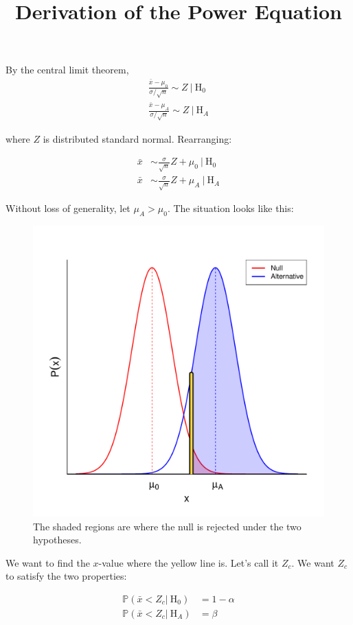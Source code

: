 \documentclass{article}
\title{Derivation of the Power Equation}
\date{}
\begin{document}
\maketitle

By the central limit theorem,
\begin{align*}
\frac{\bar{x} - \mu_0}{\sigma/\sqrt{n}}  \sim Z\ \big|\ \text{H}_0 \\
\frac{\bar{x} - \mu_A}{\sigma/\sqrt{n}}  \sim Z\ \big|\ \text{H}_A
\end{align*}

where $Z$ is distributed standard normal. Rearranging:

\begin{align*}
\bar{x} &\sim \frac{\sigma}{\sqrt{n}}Z + \mu_0\ \big|\ \text{H}_0 \\
\bar{x} &\sim \frac{\sigma}{\sqrt{n}}Z + \mu_A\ \big|\ \text{H}_A
\end{align*}

Without loss of generality, let $\mu_A > \mu_0$. The situation looks like this:

\begin{figure}[H]
    \centering
    \includegraphics[width=0.7\linewidth]{normals.pdf}
    \caption*{The shaded regions are where the null is rejected under the two hypotheses.}
\end{figure}

We want to find the $x$-value where the yellow line is. Let's call it $Z_c$. We want $Z_c$ to satisfy the two properties:

\begin{align*}
\mathbb{P}(\bar{x} < Z_c \big|\ \text{H}_0) &= 1 - \alpha\\
\mathbb{P}(\bar{x} < Z_c \big|\ \text{H}_A) &= \beta
\end{align*}
\end{document}
